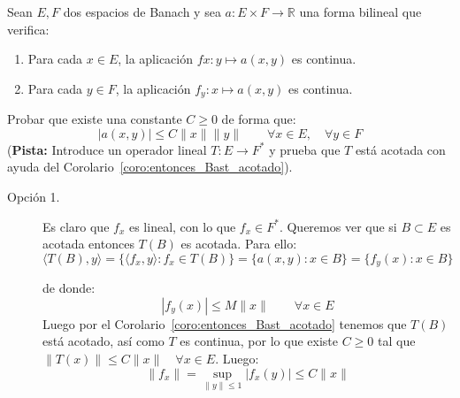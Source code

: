 \begin{ejercicio} %
    Sean $E,F$ dos espacios de Banach y sea $a:E\times F\to \mathbb{R}$ una forma bilineal que verifica:
    \begin{enumerate}
        \item Para cada $x\in E$, la aplicación $fx:y\longmapsto a(x,y)$ es continua.
        \item Para cada $y\in F$, la aplicación $f_y:x\longmapsto a(x,y)$ es continua.
    \end{enumerate}
    Probar que existe una constante $C\geq 0$ de forma que:
    \begin{equation*}
        |a(x,y)| \leq C\|x\|\|y\| \qquad \forall x\in E, \quad \forall y\in F
    \end{equation*}
    (\textbf{Pista:} Introduce un operador lineal $T:E\to F^\ast$ y prueba que $T$ está acotada con ayuda del Corolario~\ref{coro:entonces_Bast_acotado}).\\

    \begin{description}
        \item [Opción 1.] Es claro que $f_x$ es lineal, con lo que $f_x\in F^\ast$.
            Queremos ver que si $B\subset E$ es acotada entonces $T(B)$ es acotada. Para ello:
            \begin{equation*}
                \langle T(B),y \rangle  = \{\langle f_x,y \rangle :f_x\in T(B)\} = \{a(x,y):x\in B\} = \{f_y(x) : x\in B\}
            \end{equation*}

            de donde:
            \begin{equation*}
                |f_y(x)| \leq M \|x\| \qquad \forall x\in E
            \end{equation*}
            Luego por el Corolario~\ref{coro:entonces_Bast_acotado} tenemos que $T(B)$ está acotado, así como $T$ es continua, por lo que existe $C\geq 0$ tal que $\|T(x)\|\leq C\|x\|\quad \forall x\in E$. Luego:
            \begin{equation*}
                \|f_x\| = \sup_{\|y\|\leq 1}|f_x(y)| \leq C\|x\|
            \end{equation*}


\end{description}
\end{ejercicio}
